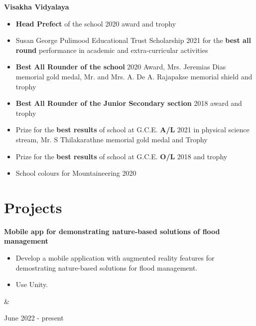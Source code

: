 \documentclass[10pt, a4paper]{article}
\newenvironment{highlights}{
        \begin{itemize}[
                topsep=0pt,
                parsep=0.10 cm,
                partopsep=0pt,
                itemsep=0pt,
                after=\vspace{-1\baselineskip},
                leftmargin=0.4 cm + 3pt
            ]
    }{
        \end{itemize}
    } %
\let\originalTabularx\tabularx
\let\originalEndTabularx\endtabularx
\renewenvironment{tabularx}{\bgroup\centering\originalTabularx}{\originalEndTabularx\par\egroup}
\begin{document}
        \textbf{Visakha Vidyalaya}  \begin{highlights}
        \item \textbf{Head Prefect} of the school 2020 award and trophy
        \item Susan George Pulimood Educational Trust Scholarship 2021 for the \textbf{best all round} performance in academic and extra-curricular activities
	   \item \textbf{Best All Rounder of the school} 2020 Award, Mrs. Jeremias Dias memorial gold medal, Mr. and Mrs. A. De A. Rajapakse memorial shield and trophy
	   \item \textbf{Best All Rounder of the Junior Secondary section} 2018 award and trophy
		\item Prize for the \textbf{best results} of school at G.C.E. \textbf{A/L} 2021 in physical science stream, Mr. S Thilakarathne memorial gold medal and Trophy
		\item Prize for the \textbf{best results} of school at G.C.E. \textbf{O/L} 2018 and trophy
		\item School colours for Mountaineering 2020
	\end{highlights}
        \par\endgroup
    
    \vspace{0.4 cm}
    
    \section{Projects}

        \begin{tabularx}{
            \textwidth-0.4 cm-0.13cm
        }{
            K{0.2 cm}
            R{4.1 cm}
        }
            \textbf{Mobile app for demonstrating nature-based solutions of flood management}

            \vspace{0.10 cm}

            \begin{highlights}
                \item Develop a mobile application with augmented reality features for demostrating nature-based solutions for flood management.
                \item Use Unity.
            \end{highlights}
            &
            

            June 2022 - present
        \end{tabularx}
\end{document}
